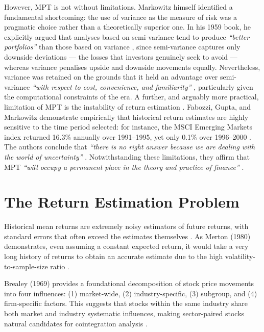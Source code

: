\documentclass[a4paper]{report}
\begin{document}
However, MPT is not without limitations. Markowitz himself identified a fundamental shortcoming: the use of variance as the measure of risk was a pragmatic choice rather than a theoretically superior one. In his 1959 book, he explicitly argued that analyses based on semi-variance tend to produce \textit{``better portfolios''} than those based on variance \cite[p.~194]{markowitz1959}, since semi-variance captures only downside deviations --- the losses that investors genuinely seek to avoid --- whereas variance penalises upside and downside movements equally. Nevertheless, variance was retained on the grounds that it held an  advantage over semi-variance \textit{``with respect to cost, convenience, and familiarity''} \cite[p.~193]{markowitz1959}, particularly given the computational constraints of the era. A further, and arguably more practical, limitation of MPT is the instability of return estimation \cite{fabozzi2002}. Fabozzi, Gupta, and Markowitz demonstrate empirically that historical return estimates are highly sensitive to the time period selected: for instance, the MSCI Emerging Markets index returned 16.3\% annually over 1991--1995, yet only 0.1\% over 1996--2000 \cite[p.~9]{fabozzi2002}. The authors conclude that \textit{``there is no right answer because we are dealing with the world of uncertainty''} \cite[p.~9]{fabozzi2002}. Notwithstanding these limitations, they affirm that MPT \textit{``will occupy a permanent place in the theory and practice of finance''} \cite[p.~22]{fabozzi2002}. 

\section{The Return Estimation Problem}
\label{sec:return-estimation}

Historical mean returns are extremely noisy estimators of future returns, with standard errors that often exceed the estimates themselves \cite{ledoit2004}. As Merton (1980) demonstrates, even assuming a constant expected return, it would take a very long history of returns to obtain an accurate estimate due to the high volatility-to-sample-size ratio \cite{merton1980}. 

Brealey (1969) provides a foundational decomposition of stock price movements into four influences: (1) market-wide, (2) industry-specific, (3) subgroup, and (4) firm-specific factors. This suggests that stocks within the same industry share both market and industry systematic influences, making sector-paired stocks natural candidates for cointegration analysis \cite{brealey1969}. 
\end{document}
